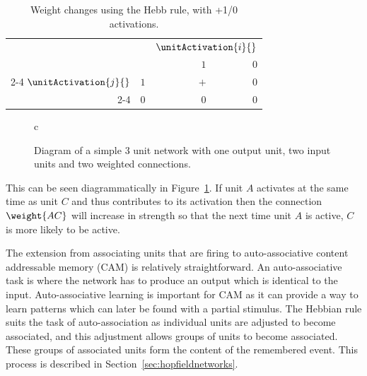 \begin{table}[htbp]
	\begin{center}
		\begin{tabular}{rr|r|r}
			\multicolumn{2}{r}{}&\multicolumn{2}{c}{\(\unitActivation{i}{}\)}\\
						&&$1$&$0$\\
\cline{2-4} $\unitActivation{j}{}$&$1$&$+$&$0$\\
\cline{2-4} &$0$&$0$&$0$\\
		\end{tabular}
	\end{center}
	\caption{Weight changes using the Hebb rule, with +1/0 activations.}
	\label{tab:WeightChangesHebbian}
\end{table}

\begin{figure}[hbtp]
  \begin{center}
        \begin{tabular}{c}
        \end{tabular}
        \caption{Diagram of a simple 3 unit network with one output unit, two input units and two weighted connections.}
        \label{fig:hebbianLearning}
  \end{center}
\end{figure}


This can be seen diagrammatically in Figure~\ref{fig:hebbianLearning}. If unit $A$ activates at the same time as unit $C$ and thus contributes to its activation then the connection $\weight{AC}$ will increase in strength so that the next time unit $A$ is active, $C$ is more likely to be active. 

The extension from associating units that are firing to auto-associative content addressable memory (CAM) is relatively straightforward.  An auto-associative task is where the network has to produce an output which is identical to the input.  Auto-associative learning is important for CAM as it can provide a way to learn patterns which can later be found with a partial stimulus.  The Hebbian rule suits the task of auto-association as individual units are adjusted to become associated, and this adjustment allows groups of units to become associated.  These groups of associated units form the content of the remembered event.  This process is described in Section~\ref{sec:hopfieldnetworks}.

